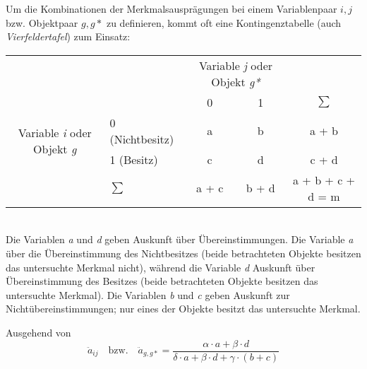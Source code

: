 Um die Kombinationen der Merkmalsausprägungen bei einem Variablenpaar $i,j$ bzw. Objektpaar $g,g*$ zu definieren, kommt oft eine Kontingenztabelle (auch \textit{Vierfeldertafel}) zum Einsatz: \\

\begin{tabular}{cl|cc|c}
	& & \multicolumn{2}{c|}{Variable \textit{j} oder Objekt \textit{g*}} & \\ 
	& & 0 & 1 & $\sum$ \\ \hline
	\multirow{2}{*}{Variable \textit{i} oder Objekt \textit{g}} & 0 (Nichtbesitz) & a & b & a + b \\
	& 1 (Besitz) & c & d & c + d \\ \hline
	& $\sum$ & a + c & b + d & a + b + c + d = m \\ 
\end{tabular}
\bigskip
\\
Die Variablen \textit{a} und \textit{d} geben Auskunft über Übereinstimmungen. Die Variable \textit{a} über die Übereinstimmung des Nichtbesitzes (beide betrachteten Objekte besitzen das untersuchte Merkmal nicht), während die Variable \textit{d} Auskunft über Übereinstimmung des Besitzes (beide betrachteten Objekte besitzen das untersuchte Merkmal). Die Variablen \textit{b} und \textit{c} geben Auskunft zur Nichtübereinstimmungen; nur eines der Objekte besitzt das untersuchte Merkmal.

Ausgehend von \citet[S. 199/200]{Bacher.2010}
\begin{equation}
\ddot{a}_{ij} \quad \text{bzw.} \quad \ddot{a}_{g,g*} = \frac{\alpha \cdot a + \beta \cdot d}{\delta \cdot a + \beta \cdot d + \gamma \cdot (b + c)}
\end{equation}

